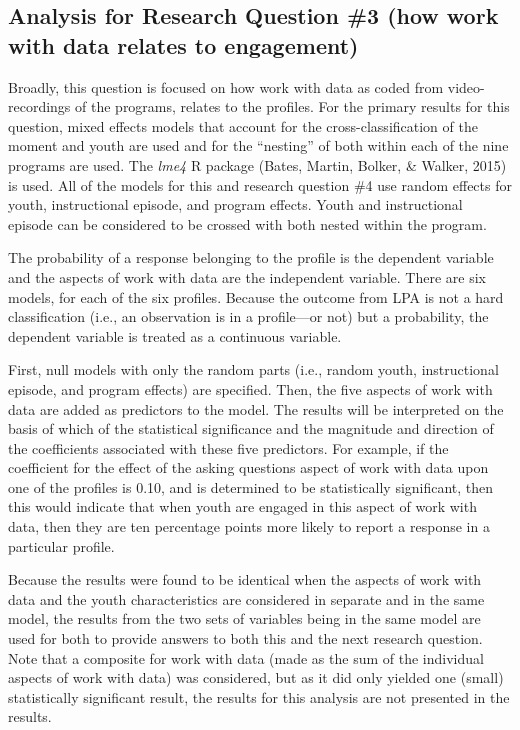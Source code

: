 \documentclass[]{book}
\theoremstyle{definition}
\theoremstyle{definition}
\theoremstyle{definition}
\theoremstyle{remark}
\begin{document}
\subsection{Analysis for Research Question \#3 (how work with data
relates to
engagement)}\label{analysis-for-research-question-3-how-work-with-data-relates-to-engagement}

Broadly, this question is focused on how work with data as coded from
video-recordings of the programs, relates to the profiles. For the
primary results for this question, mixed effects models that account for
the cross-classification of the moment and youth are used and for the
``nesting'' of both within each of the nine programs are used. The
\emph{lme4} R package (Bates, Martin, Bolker, \& Walker, 2015) is used.
All of the models for this and research question \#4 use random effects
for youth, instructional episode, and program effects. Youth and
instructional episode can be considered to be crossed with both nested
within the program.

The probability of a response belonging to the profile is the dependent
variable and the aspects of work with data are the independent variable.
There are six models, for each of the six profiles. Because the outcome
from LPA is not a hard classification (i.e., an observation is in a
profile---or not) but a probability, the dependent variable is treated
as a continuous variable.

First, null models with only the random parts (i.e., random youth,
instructional episode, and program effects) are specified. Then, the
five aspects of work with data are added as predictors to the model. The
results will be interpreted on the basis of which of the statistical
significance and the magnitude and direction of the coefficients
associated with these five predictors. For example, if the coefficient
for the effect of the asking questions aspect of work with data upon one
of the profiles is 0.10, and is determined to be statistically
significant, then this would indicate that when youth are engaged in
this aspect of work with data, then they are ten percentage points more
likely to report a response in a particular profile.

Because the results were found to be identical when the aspects of work
with data and the youth characteristics are considered in separate and
in the same model, the results from the two sets of variables being in
the same model are used for both to provide answers to both this and the
next research question. Note that a composite for work with data (made
as the sum of the individual aspects of work with data) was considered,
but as it did only yielded one (small) statistically significant result,
the results for this analysis are not presented in the results.
\end{document}
